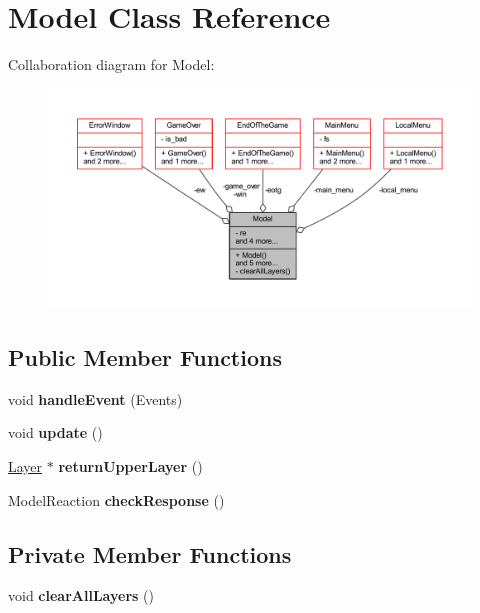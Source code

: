 \hypertarget{class_model}{}\section{Model Class Reference}
\label{class_model}


Collaboration diagram for Model\+:\nopagebreak
\begin{figure}[H]
\begin{center}
\leavevmode
\includegraphics[width=350pt]{class_model__coll__graph}
\end{center}
\end{figure}
\subsection*{Public Member Functions}
\begin{DoxyCompactItemize}
\item 
\mbox{\label{class_model_a3505310b3aa1dc990032bce198a6c9fb}} 
void {\bfseries handle\+Event} (Events)
\item 
\mbox{\label{class_model_a8976f84f757eb3cd68b2aa7eeb5a345f}} 
void {\bfseries update} ()
\item 
\mbox{\label{class_model_acdaa9cd882c6f43d0ea60bc7010acfa2}} 
\hyperlink{class_layer}{Layer} $\ast$ {\bfseries return\+Upper\+Layer} ()
\item 
\mbox{\label{class_model_aabbd887291832c912bc39487f829fb9a}} 
Model\+Reaction {\bfseries check\+Response} ()
\end{DoxyCompactItemize}
\subsection*{Private Member Functions}
\begin{DoxyCompactItemize}
\item 
\mbox{\label{class_model_a3ad6a6d48906c82bc5ef7ff0ad00b190}} 
void {\bfseries clear\+All\+Layers} ()
\end{DoxyCompactItemize}
